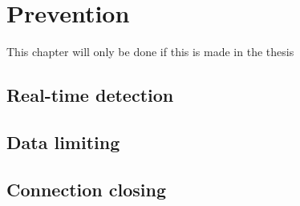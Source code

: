 
\chapter{Prevention} %

\label{prevention} %

This chapter will only be done if this is made in the thesis
\section{Real-time detection}

\section{Data limiting}

\section{Connection closing}
